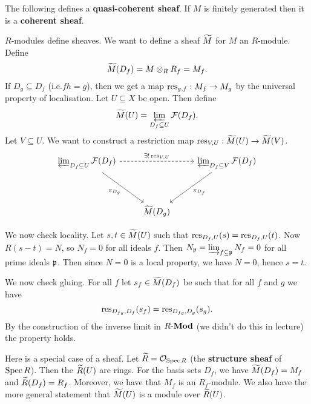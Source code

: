 \begin{defn}
  The following defines a \textbf{quasi-coherent sheaf}.
  If $M$ is finitely generated then it is a \textbf{coherent sheaf}.

  $R$-modules define sheaves.
  We want to define a sheaf $\widetilde M$ for $M$ an $R$-module.
  Define
  \[\widetilde M(D_f) = M \otimes_R R_f = M_f.\]
  If $D_g \subseteq D_f$ (i.e.\@ $fh=g$), then we get a map $\operatorname{res}_{g,f}: M_f \to M_g$ by the universal property of localisation.
  Let $U \subseteq X$ be open.
  Then define
  \[\widetilde M(U) = \varprojlim_{D_f \subseteq U} \mathcal{F}(D_f).\]
  Let $V \subseteq U$.
  We want to construct a restriction map $\operatorname{res}_{V,U}: \widetilde M(U) \to \widetilde M(V)$.
  \begin{equation*}
    \begin{tikzcd}[row sep=huge]
      \varprojlim_{D_f \subseteq U} \ca F(D_f) \ar[rd, "\pi_{D_g}"'] \ar[rr, "\exists ! \res_{V,U}", dashed] && \varprojlim_{D_f \subseteq V} \ca F(D_f) \ar[ld, "\pi_{D_f}"] \\
      & \wt M(D_g) &
    \end{tikzcd}
  \end{equation*}

  We now check locality.
  Let $s,t \in \widetilde M(U)$ such that $\operatorname{res}_{D_f,U}(s) = \operatorname{res}_{D_f,U}(t)$.
  Now $R(s-t)=N$, so $N_f=0$ for all ideals $f$.
  Then $N_{\mathfrak{p}} = \varinjlim_{f \subseteq \mathfrak{p}} N_f = 0$ for all prime ideals $\mathfrak{p}$.
  Then since $N=0$ is a local property, we have $N=0$, hence $s=t$.

  We now check gluing.
  For all $f$ let $s_f \in \widetilde M(D_f)$ be such that for all $f$ and $g$ we have
  \[\operatorname{res}_{D_{fg},D_f}(s_f) = \operatorname{res}_{D_{fg},D_g}(s_g).\]
  By the construction of the inverse limit in $R\mbox{-}\mathbf{Mod}$ (we didn't do this in lecture) the property holds.
\end{defn}

\begin{exam}
  Here is a special case of a sheaf.
  Let $\widetilde R = \mathcal{O}_{\operatorname{Spec} R}$ (the \textbf{structure sheaf} of $\operatorname{Spec} R$).
  Then the $\widetilde R(U)$ are rings.
  For the basis sets $D_f$, we have $\widetilde M(D_f)=M_f$ and $\widetilde R(D_f) = R_f$.
  Moreover, we have that $M_f$ is an $R_f$-module.
  We also have the more general statement that $\widetilde M(U)$ is a module over $\widetilde R(U)$.
\end{exam}
